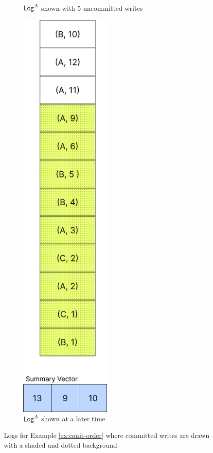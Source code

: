 \documentclass[]             %
{NASA}                       %
\theoremstyle{definition}
\begin{document}
\begin{figure}
\begin{subfigure}{0.5\textwidth}
    \caption{$\mathsf{Log}^{A}$ shown with $5$ uncommitted writes}
    \label{fig:conit-order-a}
  \end{subfigure}%
  \begin{subfigure}{0.5\textwidth}
    \centering
    \includegraphics[width=0.5\textwidth]{images/conit/Order2.png}
    \caption{$\mathsf{Log}^{A}$ shown at a later time}
    \label{fig:conit-order-b}
  \end{subfigure}
  \caption{Logs for Example \ref{ex:conit-order} where committed writes are drawn with a shaded and dotted background}
  \label{fig:conit-order}
\end{figure}
\end{document}
